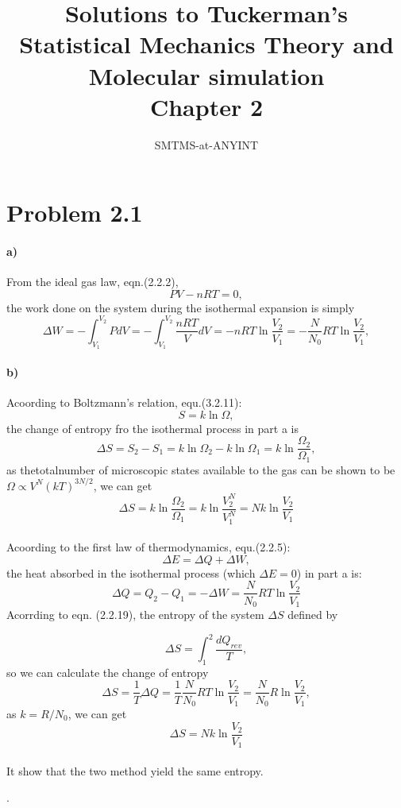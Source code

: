 \documentclass{article}
\author{SMTMS-at-ANYINT}
\title{\bf{Solutions to Tuckerman's Statistical Mechanics Theory and Molecular simulation}\\Chapter 2}
\begin{document}
	\maketitle
	\section*{Problem 2.1}
	\paragraph{a)}
	From the ideal gas law, eqn.(2.2.2), 
	$$PV - nRT = 0,$$
	the work done on the system during the isothermal expansion is simply
	$$ \Delta W = -\int^{V_{2}}_{V_{1}} PdV = -\int^{V_{2}}_{V_{1}} \frac{nRT}{V} dV = -nRT\ln \frac{V_{2}}{V_{1}} = -\frac{N}{N_{0}}RT\ln \frac{V_{2}}{V_{1}}, $$ 
	\paragraph{b)}
	Acoording to Boltzmann's relation, equ.(3.2.11):
	$$S = k \ln \Omega, $$
	the change of entropy fro the isothermal process in part a is
	$$\Delta S = S_{2} - S_{1} = k \ln \Omega_{2} - k \ln \Omega_{1} = k\ln \frac{\Omega_{2}}{\Omega_{1}},$$
	as thetotalnumber of microscopic states available to the gas can be shown to be $\Omega \propto V^{N}(kT)^{3N/2}$, we can get
	$$\Delta S = k \ln \frac{\Omega_{2}}{\Omega_{1}} = k\ln \frac{V^{N}_{2}}{V^{N}_{1}} = Nk\ln\frac{V_{2}}{V_{1}}$$
	~\\
	Acoording to the first law of thermodynamics, equ.(2.2.5):
	$$\Delta E = \Delta Q + \Delta W,$$
	the heat absorbed in the isothermal process (which $\Delta E = 0 $) in part a is:
	$$\Delta Q = Q_{2} - Q_{1} = - \Delta W = \frac{N}{N_{0}}RT\ln \frac{V_{2}}{V_{1}} $$ 
	Acorrding to eqn. (2.2.19), the entropy of the system $\Delta S $ defined by
	
	$$\Delta S = \int_{1}^{2} \frac{dQ_{rev}}{T},$$
	so we can calculate the change of entropy 
	$$\Delta S = \frac{1}{T} \Delta Q = \frac{1}{T} \frac{N}{N_{0}}RT\ln \frac{V_{2}}{V_{1}} = \frac{N}{N_{0}}R\ln \frac{V_{2}}{V_{1}}, $$
	as $k=R/N_{0}$, we can get 
	$$\Delta S = Nk \ln \frac{V_{2}}{V_{1}}$$
	~\\
	It show that the two method yield the same entropy.

	
	
	
	
	
	
.
\end{document}
